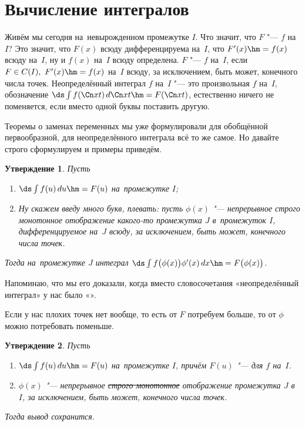 \documentclass[a4paper,10pt,twoside]{article}
\newtheorem{Ut}{Утверждение}[section]
\let\AVsection\section{}
\renewcommand\section{\newpage\scol\AVsection}
\newcommand{\scol}{  \renewcommand{\headrulewidth}{0.5pt}\fancyhead[RE,LO]{\thesection{} \leftmark} \fancyhead[LE,RO]{\thepage}}
\begin{document}
 \section{Вычисление интегралов}

Живём мы сегодня на~невырожденном промежутке $I$. Что значит, что $F$ "--- \tp{} $f$ на~$I$? Это
значит, что $F(x)$ всюду дифференцируема на~$I$, что $F'(x)\hm=f(x)$ всюду на~$I$, ну и $f(x)$ на~$I$ всюду определена.
$F$ "--- \op{} $f$ на~$I$, если $F\in C(I),\ F'(x)\hm=f(x)$ на~$I$ всюду, за исключением, быть может, конечного числа точек.
Неопределённый интеграл $f$ на~$I$ "--- это произвольная \op{} $f$ на~$I$, обозначение $\ds\int f(\Cn xt)\,d\Cn xt\hm=F(\Cn xt)$, естественно
ничего не поменяется, если вместо одной буквы поставить другую.

Теоремы о заменах переменных мы уже формулировали для обобщённой первообразной, для неопределённого интеграла всё то же самое. Но давайте строго
сформулируем и примеры приведём.

\begin{Ut}\label{I1}
	Пусть \begin{enumerate}
	  \item $\ds\int f(u)\,du\hm=F(u)$ на~промежутке $I$;
	  \item Ну скажем введу много букв, плевать: пусть $\phi(x)$ "--- непрерывное строго монотонное отображение какого-то промежутка $J$ в~промежуток
	  $I$, дифференцируемое на~$J$ всюду, за исключением, быть может, конечного числа точек.
	  \end{enumerate} 
	  
	  Тогда на~промежутке $J$ интеграл $\ds\int f\big(\phi(x)\big)\phi'(x)\,dx\hm=F\big(\phi(x)\big)$.  
	
\end{Ut}

Напоминаю, что мы его доказали, когда вместо словосочетания «неопределённый интеграл» у нас было «\op».

Если у нас плохих точек нет вообще, то есть от $F$ потребуем больше, то от $\phi$ можно потребовать поменьше.

\begin{Ut}\label{I2}
	Пусть \begin{enumerate}
	  \item $\ds\int f(u)\,du\hm=F(u)$ на~промежутке $I$, причём $F(u)$ "--- \tp{} для $f$ на~$I$.
	  \item $\phi(x)$ "--- непрерывное \sout{строго монотонное} отображение промежутка $J$ в~$I$, за исключением, быть может,
	  конечного числа точек.
	\end{enumerate}
	
	Тогда вывод сохранится.
\end{Ut}
\end{document}
